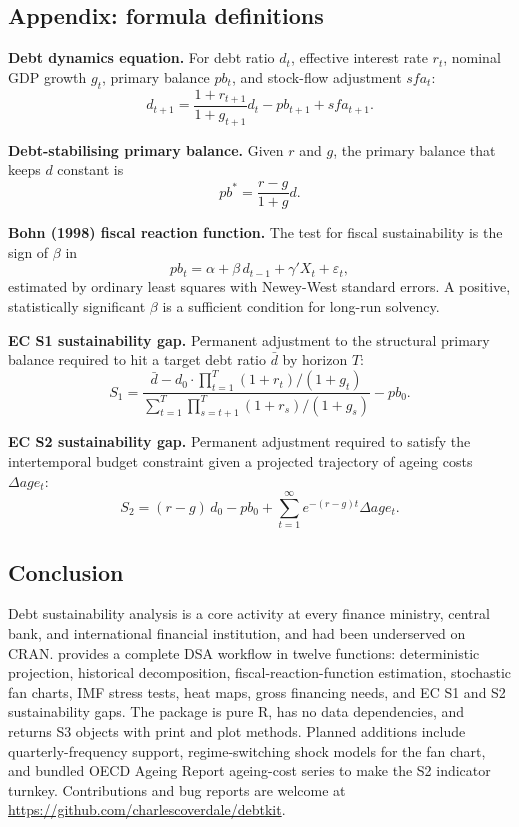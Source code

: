 \subsection{Appendix: formula
definitions}\label{appendix-formula-definitions}

\textbf{Debt dynamics equation.} For debt ratio \(d_t\), effective
interest rate \(r_t\), nominal GDP growth \(g_t\), primary balance
\(pb_t\), and stock-flow adjustment \(sfa_t\):
\[d_{t+1} = \frac{1 + r_{t+1}}{1 + g_{t+1}} d_t - pb_{t+1} + sfa_{t+1}.\]

\textbf{Debt-stabilising primary balance.} Given \(r\) and \(g\), the
primary balance that keeps \(d\) constant is
\[pb^* = \frac{r - g}{1 + g} d.\]

\textbf{Bohn (1998) fiscal reaction function.} The test for fiscal
sustainability is the sign of \(\beta\) in
\[pb_t = \alpha + \beta\, d_{t-1} + \gamma' X_t + \varepsilon_t,\]
estimated by ordinary least squares with Newey-West standard errors. A
positive, statistically significant \(\beta\) is a sufficient condition
for long-run solvency.

\textbf{EC S1 sustainability gap.} Permanent adjustment to the
structural primary balance required to hit a target debt ratio
\(\bar{d}\) by horizon \(T\):
\[S_1 = \frac{\bar{d} - d_0 \cdot \prod_{t=1}^{T} (1+r_t)/(1+g_t)}{\sum_{t=1}^{T}\prod_{s=t+1}^{T}(1+r_s)/(1+g_s)} - pb_0.\]

\textbf{EC S2 sustainability gap.} Permanent adjustment required to
satisfy the intertemporal budget constraint given a projected trajectory
of ageing costs \(\Delta age_t\):
\[S_2 = (r - g)\, d_0 - pb_0 + \sum_{t=1}^{\infty} e^{-(r-g)t} \Delta age_t.\]

\subsection{Conclusion}\label{conclusion}

Debt sustainability analysis is a core activity at every finance
ministry, central bank, and international financial institution, and had
been underserved on CRAN.  provides a complete DSA
workflow in twelve functions: deterministic projection, historical
decomposition, fiscal-reaction-function estimation, stochastic fan
charts, IMF stress tests, heat maps, gross financing needs, and EC S1
and S2 sustainability gaps. The package is pure R, has no data
dependencies, and returns S3 objects with print and plot methods.
Planned additions include quarterly-frequency support, regime-switching
shock models for the fan chart, and bundled OECD Ageing Report
ageing-cost series to make the S2 indicator turnkey. Contributions and
bug reports are welcome at
\url{https://github.com/charlescoverdale/debtkit}.

